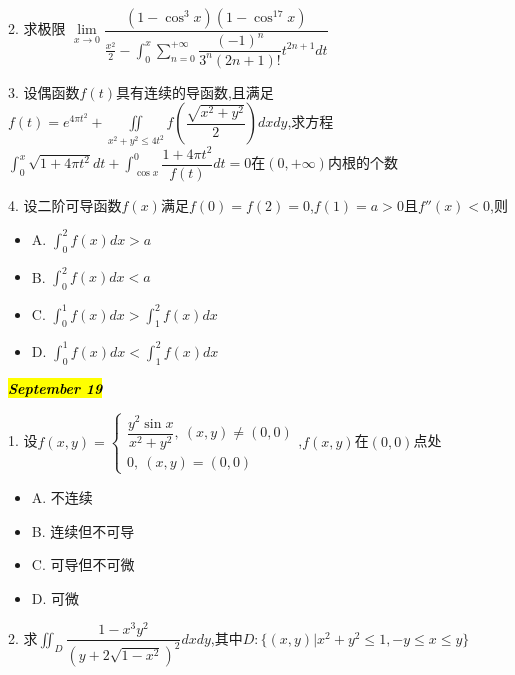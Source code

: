 2. 求极限 $\lim\limits_{x\rightarrow 0 }\dfrac{(1-\cos^3 x)(1-\cos^{17} x)}{\frac{x^2}{2}-\int_{0}^{x}\sum\limits_{n=0}^{+\infty}\dfrac{(-1)^n}{3^n(2n+1)!}t^{2n+1}dt}$
\begin{solution}
	
\end{solution}

3. 设偶函数$f(t)$具有连续的导函数,且满足$f(t)=e^{4\pi t^2}+\iint\limits_{x^2+y^2\leq 4t^2}f(\dfrac{\sqrt{x^2+y^2}}{2})dxdy$,求方程$\int_{0}^{x}\sqrt{1+4\pi t^2}dt+\int_{\cos x}^{0}\dfrac{1+4\pi t^2}{f(t)}dt=0$在$(0,+\infty)$内根的个数
\begin{solution}
	
\end{solution}

4. 设二阶可导函数$f(x)$满足$f(0)=f(2)=0$,$f(1)=a>0$且$f''(x)<0$,则
\begin{itemize}
	\item A. $\int_{0}^{2}f(x)dx>a$
	\item B. $\int_{0}^{2}f(x)dx<a$
	\item C. $\int_{0}^{1}f(x)dx>\int_{1}^{2}f(x)dx$
	\item D. $\int_{0}^{1}f(x)dx<\int_{1}^{2}f(x)dx$
\end{itemize}
\begin{solution}
	
\end{solution}

\hl{\textbf{\textit{September 19}}}

1. 设$f(x,y)=\left\lbrace 
\begin{array}{l}
	\dfrac{y^2\sin x}{x^2+y^2},\ (x,y)\neq (0,0)\\
	0,\ (x,y)=(0,0)
\end{array}
\right. $,$f(x,y)$在$(0,0)$点处
\begin{itemize}
	\item A. 不连续
	\item B. 连续但不可导
	\item C. 可导但不可微
	\item D. 可微
\end{itemize}
\begin{solution}
	
\end{solution}

2. 求$\iint_{D}\dfrac{1-x^3y^2}{(y+2\sqrt{1-x^2})^2}dxdy$,其中$D:\{(x,y)|x^2+y^2\leq 1,-y\leq x\leq y\}$
\begin{solution}
	
\end{solution}

